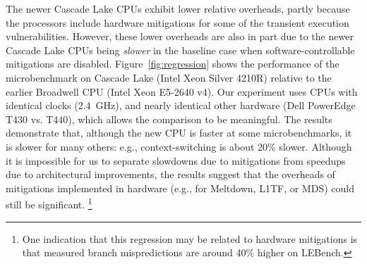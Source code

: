 The newer Cascade Lake CPUs exhibit lower relative overheads, partly
because the processors include hardware mitigations for some of the
transient execution vulnerabilities.  However, these lower overheads
are also in part due to the newer Cascade Lake CPUs being \emph{slower}
in the baseline case when software-controllable mitigations are disabled.
Figure~\ref{fig:regression} shows the performance of the microbenchmark
on Cascade Lake (Intel Xeon Silver 4210R) relative to the earlier
Broadwell CPU (Intel Xeon E5-2640 v4).  Our experiment uses CPUs
with identical clocks (2.4~GHz), and nearly identical other hardware
(Dell PowerEdge T430 vs. T440), which allows the comparison to be
meaningful.  The results demonstrate that, although the new CPU is
faster at some microbenchmarks, it is slower for many others: e.g.,
context-switching is about 20\% slower.  Although it is impossible for us to
separate slowdowns due to mitigations from speedups due to architectural
improvements, the results suggest that the overheads of mitigations implemented
in hardware (e.g., for Meltdown, L1TF, or MDS) could still be significant.
\footnote{One indication that this regression may be related to hardware
  mitigations is that measured branch mispredictions are around 40\% higher on
  LEBench.}


